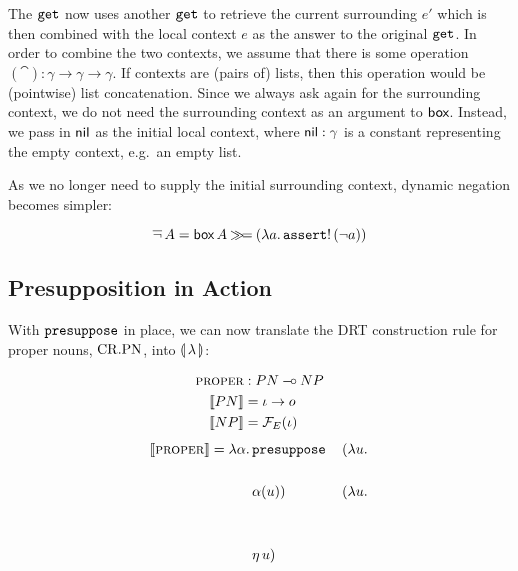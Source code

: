 The $\mathtt{get}$ now uses another $\mathtt{get}$ to retrieve the current
surrounding $e'$ which is then combined with the local context $e$ as the
answer to the original $\mathtt{get}$. In order to combine the two contexts, we
assume that there is some operation
$(\cat) : \gamma \to \gamma \to \gamma$. If contexts are (pairs of) lists,
then this operation would be (pointwise) list concatenation. Since we
always ask again for the surrounding context, we do not need the
surrounding context as an argument to $\textsf{box}$. Instead, we pass in $\textsf{nil}$ as
the initial local context, where $\textsf{nil} : \gamma$ is a constant representing
the empty context, e.g.\ an empty list.

As we no longer need to supply the initial surrounding context, dynamic
negation becomes simpler:

$$
\mathop{\overline{\lnot}} A = \textsf{box}\,A \mathbin{\gg\!=} (\lambda a.\, \mathtt{assert}!\,(\lnot a))
$$


\subsection{Presupposition in Action}
\label{ssec:presupposition-in-action}

With $\mathtt{presuppose}$ in place, we can now translate the DRT construction
rule for proper nouns, $\mathrm{CR.PN}$, into $\llparenthesis \, \lambda \, \rrparenthesis$:

\vspace{6mm}

\hspace{-1cm}
\begin{minipage}{0.69\textwidth}
\crpnbox
\end{minipage}
\begin{minipage}{0.31\textwidth}
\vspace{-4mm}
\begin{align*}
\textsc{proper} &: PN \mathbin{{-}\mkern-3.5mu{\circ}} NP \\
\llbracket PN \rrbracket &= \iota \to o \\
\llbracket NP \rrbracket &= \mathcal{F}_E(\iota)
\end{align*}
\vspace{2mm}
\begin{align*}
  \llbracket \textsc{proper} \rrbracket =
  \lambda \alpha.\, &\mathtt{presuppose}\,&(\lambda u.\,  \\
               \\
               &\alpha(u))\,&(\lambda u.\,  \\
               \\ \\
               & \eta\,u)
\end{align*}
\end{minipage}

